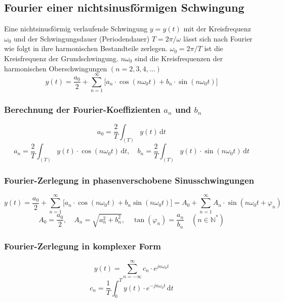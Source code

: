 \subsection{Fourier einer nichtsinusförmigen Schwingung}
Eine nichtsinusförmig verlaufende Schwingung $y=y\left(t\right)$ mit der Kreisfrequenz $\omega_0$ und der Schwingungsdauer (Periodendauer) $T=2\pi/\omega$ lässt sich nach Fourier wie folgt in ihre harmonischen Bestandteile zerlegen. $\omega_0=2\pi/T$ ist die Kreisfrequenz der Grundschwingung. $n\omega_0$ sind die Kreisfrequenzen der harmonischen Oberschwingungen $\left(n=2, 3, 4, \dotso \right)$ 
\begin{equation}
\boxed{y\left(t\right)=\dfrac{a_0}{2}+\displaystyle \sum_{n=1}^{\infty}\Big[a_n\cdot \cos\left(n\omega_0t\right)+b_n\cdot \sin\left(n\omega_0t\right)\Big]}
\end{equation}
\subsubsection{Berechnung der Fourier-Koeffizienten $a_n$ und $b_n$}
\begin{equation}
\boxed{a_0=\dfrac{2}{T}\displaystyle\int_{\left(T\right)}y\left(t\right)\,\text{d}t}
\end{equation}
\begin{equation}
\boxed{a_n=\dfrac{2}{T}\displaystyle \int_{\left(T\right)}y\left(t\right)\cdot \cos\left(n\omega_0t\right)\,\text{d}t,\quad b_n=\dfrac{2}{T}\displaystyle \int_{\left(T\right)}y\left(t\right)\cdot \sin\left(n\omega_0t\right)\,\text{d}t}
\end{equation}
\subsubsection{Fourier-Zerlegung in phasenverschobene Sinusschwingungen}
\begin{equation}
\boxed{y\left(t\right)=\dfrac{a_0}{2}+\displaystyle \sum_{n=1}^{\infty}\Big[a_n\cdot \cos\left(n\omega_0t\right)+b_n\sin\left(n\omega_0t\right)\Big]=A_0+\displaystyle \sum_{n=1}^{\infty}A_n\cdot \sin\left(n\omega_0t+\varphi_n\right)}
\end{equation}
\begin{equation}
\boxed{A_0=\dfrac{a_0}{2},\quad A_n=\sqrt{a_n^2+b_n^2},\quad \tan\left(\varphi_n\right)=\dfrac{a_n}{b_n}\quad \left(n\in \mathbb{N}^*\right)}
\end{equation}
\subsubsection{Fourier-Zerlegung in komplexer Form}
\begin{equation}
\boxed{y\left(t\right)=\displaystyle \sum_{n=-\infty}^{\infty}c_n\cdot e^{jn\omega_0t}}
\end{equation}
\begin{equation}
\boxed{c_n=\dfrac{1}{T}\displaystyle \int_{0}^Ty\left(t\right)\cdot e^{-jn\omega_0t}\,\text{d}t}
\end{equation}
